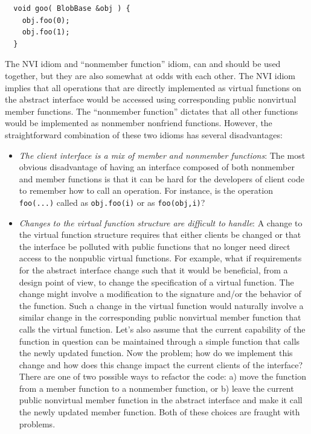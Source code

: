 \documentclass[pdf,ps2pdf,11pt]{SANDreport}
\begin{document}
{\small\begin{verbatim}
  void goo( BlobBase &obj ) {
    obj.foo(0);
    obj.foo(1);
  }
\end{verbatim}}

The NVI idiom and ``nonmember function'' idiom, can and should be used
together, but they are also somewhat at odds with each other.  The NVI idiom
implies that all operations that are directly implemented as virtual functions
on the abstract interface would be accessed using corresponding public
nonvirtual member functions.  The ``nonmember function'' dictates that all
other functions would be implemented as nonmember nonfriend functions.
However, the straightforward combination of these two idioms has several
disadvantages:

\begin{itemize}

{}\item\textit{The client interface is a mix of member and nonmember
functions}: The most obvious disadvantage of having an interface composed of
both nonmember and member functions is that it can be hard for the developers
of client code to remember how to call an operation.  For instance, is the
operation {}\texttt{foo(...)} called as {}\texttt{obj.foo(i)} or as
{}\texttt{foo(obj,i)}?

{}\item\textit{Changes to the virtual function structure are difficult to
handle}: A change to the virtual function structure requires that either
clients be changed or that the interface be polluted with public functions
that no longer need direct access to the nonpublic virtual functions.  For
example, what if requirements for the abstract interface change such that it
would be beneficial, from a design point of view, to change the specification
of a virtual function.  The change might involve a modification to the
signature and/or the behavior of the function.  Such a change in the virtual
function would naturally involve a similar change in the corresponding public
nonvirtual member function that calls the virtual function.  Let's also assume
that the current capability of the function in question can be maintained
through a simple function that calls the newly updated function.  Now the
problem; how do we implement this change and how does this change impact the
current clients of the interface?  There are one of two possible ways to
refactor the code: a) move the function from a member function to a nonmember
function, or b) leave the current public nonvirtual member function in the
abstract interface and make it call the newly updated member function.  Both
of these choices are fraught with problems.

\end{itemize}
\end{document}
